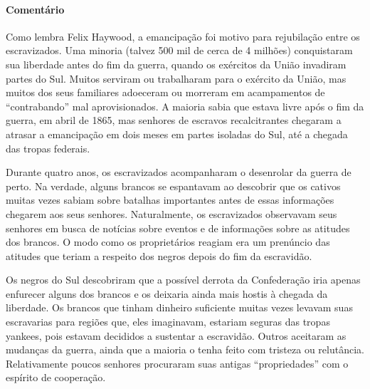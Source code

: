 \paragraph{Comentário}\quad
{\small
Como lembra Felix Haywood, a emancipação foi motivo para
rejubilação entre os escravizados. Uma minoria (talvez 500 mil de cerca de 4
milhões) conquistaram sua liberdade antes do fim da guerra,
quando os exércitos da União invadiram partes do Sul. Muitos
serviram ou trabalharam para o exército da União, mas muitos
dos seus familiares adoeceram ou morreram em acampamentos de
``contrabando'' mal aprovisionados. A maioria sabia que
estava livre após o fim da guerra, em abril de 1865, mas senhores de
escravos recalcitrantes chegaram a atrasar a emancipação em dois meses
em partes isoladas do Sul, até a chegada das tropas federais.

Durante quatro anos, os escravizados acompanharam o desenrolar da
guerra de perto. Na verdade, alguns brancos se espantavam ao descobrir
que os cativos muitas vezes sabiam sobre batalhas importantes antes de
essas informações chegarem aos seus senhores. Naturalmente, os escravizados
observavam seus senhores em busca de notícias sobre eventos e de
informações sobre as atitudes dos brancos. O modo como os proprietários
reagiam era um prenúncio das atitudes que teriam a respeito dos negros
depois do fim da escravidão.

Os negros do Sul descobriram que a possível derrota da
Confederação iria apenas enfurecer alguns dos brancos e os deixaria
ainda mais hostis à chegada da liberdade. Os brancos que tinham dinheiro
suficiente muitas vezes levavam suas escravarias para regiões que, eles
imaginavam, estariam seguras das tropas yankees, pois estavam decididos
a sustentar a escravidão. Outros aceitaram as mudanças da guerra, ainda
que a maioria o tenha feito com tristeza ou relutância. Relativamente
poucos senhores procuraram suas antigas ``propriedades'' com o espírito
de cooperação.
}

